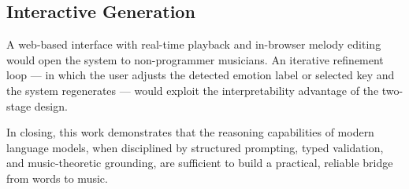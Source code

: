 \subsection{Interactive Generation}

A web-based interface with real-time playback and in-browser melody editing
would open the system to non-programmer musicians. An iterative refinement
loop --- in which the user adjusts the detected emotion label or selected
key and the system regenerates --- would exploit the interpretability
advantage of the two-stage design.

\vspace{1em}
\noindent
In closing, this work demonstrates that the reasoning capabilities of
modern language models, when disciplined by structured prompting, typed
validation, and music-theoretic grounding, are sufficient to build a
practical, reliable bridge from words to music.
